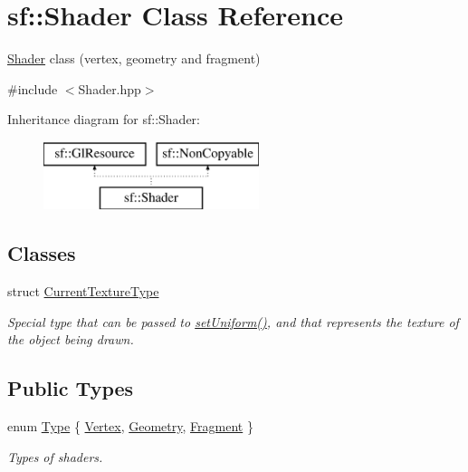 \hypertarget{classsf_1_1_shader}{}\section{sf\+:\+:Shader Class Reference}
\label{classsf_1_1_shader}


\hyperlink{classsf_1_1_shader}{Shader} class (vertex, geometry and fragment)  




{\ttfamily \#include $<$Shader.\+hpp$>$}

Inheritance diagram for sf\+:\+:Shader\+:\begin{figure}[H]
\begin{center}
\leavevmode
\includegraphics[height=2.000000cm]{classsf_1_1_shader}
\end{center}
\end{figure}
\subsection*{Classes}
\begin{DoxyCompactItemize}
\item 
struct \hyperlink{structsf_1_1_shader_1_1_current_texture_type}{Current\+Texture\+Type}
\begin{DoxyCompactList}\small\item\em Special type that can be passed to \hyperlink{classsf_1_1_shader_abf78e3bea1e9b0bab850b6b0a0de29c7}{set\+Uniform()}, and that represents the texture of the object being drawn. \end{DoxyCompactList}\end{DoxyCompactItemize}
\subsection*{Public Types}
\begin{DoxyCompactItemize}
\item 
enum \hyperlink{classsf_1_1_shader_afaa1aa65e5de37b74d047da9def9f9b3}{Type} \{ \hyperlink{classsf_1_1_shader_afaa1aa65e5de37b74d047da9def9f9b3a8718008f827eb32e29bbdd1791c62dce}{Vertex}, 
\hyperlink{classsf_1_1_shader_afaa1aa65e5de37b74d047da9def9f9b3a812421100fd57456727375938fb62788}{Geometry}, 
\hyperlink{classsf_1_1_shader_afaa1aa65e5de37b74d047da9def9f9b3ace6e88eec3a56b2e55ee3c8e64e9b89a}{Fragment}
 \}\begin{DoxyCompactList}\small\item\em Types of shaders. \end{DoxyCompactList}
\end{DoxyCompactItemize}
